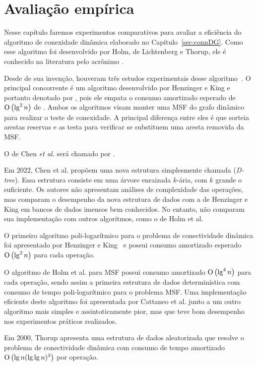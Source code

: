 \chapter{Avaliação empírica}

Nesse capítulo faremos experimentos comparativos para avaliar a eficiência do algoritmo de conexidade dinâmica elaborado no Capítulo~\ref{sec:connDG}. Como esse algoritmo foi desenvolvido  por Holm, de Lichtenberg e Thorup, ele é conhecido na literatura pelo acrônimo \HDT.

Desde de sua invenção, houveram três estudos experimentais desse algoritmo~\cite{EmpiricalStudy1997, EmpiricalStudy2002, Zaroliagis2002}. O principal concorrente é um algoritmo desenvolvido por Henzinger e King e portanto denotado por \HK, pois ele empata o consumo amortizado esperado de $\text{O}\left(\lg^2 n\right)$ de \HDT. Ambos os algoritmos visam manter uma MSF do grafo dinâmico para realizar o teste de conexidade. A principal diferença entre eles é que \HK{} sorteia arestas reservas e as testa para verificar se substituem uma aresta removida da MSF.


O de Chen \textit{et al.} será chamado por \CLHB.

Em $2022$, Chen et al. \cite{QC22} propõem uma nova estrutura simplesmente chamada  (\textit{D-tree}). Essa estrutura consiste em uma árvore enraizada $k$-ária, com $k$ grande o suficiente. Os autores não apresentam análises de complexidade das operações, mas comparam o desempenho da nova estrutura de dados com a de Henzinger e King em bancos de dados imensos bem conhecidos. No entanto, não comparam sua implementação com outros algoritmos, como o de Holm et al.



O primeiro algoritmo poli-logarítmico para o problema de conectividade dinâmica foi apresentado por Henzinger e King~\cite{HenzingerKing} e possui consumo amortizado esperado $\text{O}\left(\lg^2 n\right)$ para cada operação. 



O algoritmo de Holm et al. para MSF possui consumo amortizado $\text{O}\left(\lg^4 n\right)$ para cada operação, sendo assim a primeira estrutura de dados determinística com consumo de tempo poli-logarítmico para o problema MSF. Uma implementação eficiente deste algoritmo foi apresentada por Cattaneo et al. \cite{xpstudy2002} junto a um outro algoritmo mais simples e assintoticamente pior, mas que teve bom desempenho nos experimentos práticos realizados.

Em $2000$, Thorup \cite{Thorup2000} apresenta uma estrutura de dados aleatorizada que resolve o problema de conectividade dinâmica com consumo de tempo amortizado $\text{O}\left(\lg n(\lg\lg n)^3\right)$ por operação.





